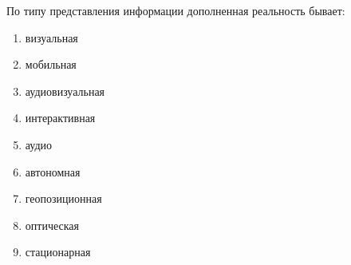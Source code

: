 
По типу представления информации дополненная реальность бывает:

\begin{enumerate}
    \item визуальная
    \item мобильная
    \item аудиовизуальная
    \item интерактивная
    \item аудио
    \item автономная
    \item геопозиционная
    \item оптическая
    \item стационарная
\end{enumerate}